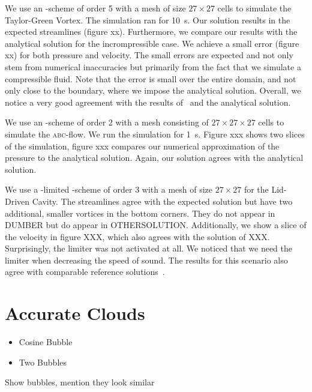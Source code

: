 We use an \aderdg{}-scheme of order 5 with a mesh of size $27 \times 27$ cells to simulate the Taylor-Green Vortex.
The simulation ran for \SI{10}{\s}.
Our solution results in the expected streamlines (figure xx).
Furthermore, we compare our results with the analytical solution for the incrompressible case.
We achieve a small error (figure xx) for both pressure and velocity.
The small errors are expected and not only stem from numerical inaccuracies but primarily from the fact that we simulate a compressible fluid.
Note that the error is small over the entire domain, and not only close to the boundary, where we impose the analytical solution.
Overall, we notice a very good agreement with the results of~\cite{dumbser2016high} and the analytical solution.

We use an \aderdg{}-scheme of order 2 with a mesh consisting of $27 \times 27 \times 27$ cells to simulate the \textsc{abc}-flow.
We run the simulation for \SI{1}{\s}.
Figure xxx shows two slices of the simulation, figure xxx compares our numerical approximation of the pressure to the analytical solution.
Again, our solution agrees with the analytical solution.

We use a \muscl{}-limited \aderdg{}-scheme of order 3 with a mesh of size $27 \times 27$ for the Lid-Driven Cavity.
The streamlines agree with the expected solution but have two additional, smaller vortices in the bottom corners.
They do not appear in DUMBER but do appear in OTHERSOLUTION.
Additionally, we show a slice of the velocity in figure XXX, which also agrees with the solution of XXX.
Surprisingly, the limiter was not activated at all.
We noticed that we need the limiter when decreasing the speed of sound. 
The results for this scenario also agree with comparable reference solutions~\cite{ghia1982high}.

\section{Accurate Clouds}
\begin{itemize}
\item Cosine Bubble
\item Two Bubbles
\end{itemize}
Show bubbles, mention they look similar
